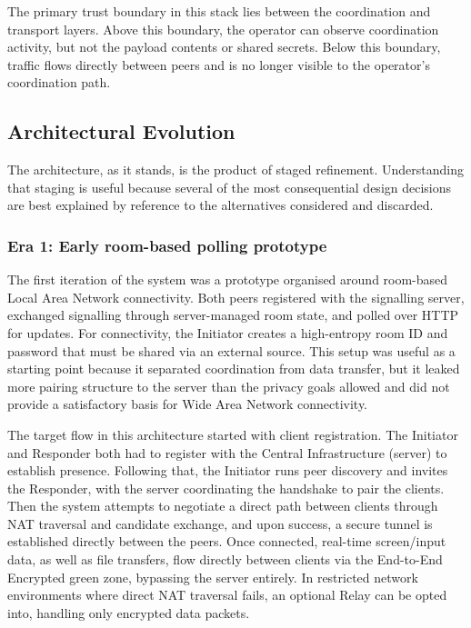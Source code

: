 \documentclass[12pt,a4paper]{article}
\begin{document}
The primary trust boundary in this stack lies between the coordination and transport layers. Above this boundary, the operator can observe coordination activity, but not the payload contents or shared secrets. Below this boundary, traffic flows directly between peers and is no longer visible to the operator’s coordination path.

\subsection{Architectural Evolution}

The architecture, as it stands, is the product of staged refinement. Understanding that staging is useful because several of the most consequential design decisions are best explained by reference to the alternatives considered and discarded.

\subsubsection{Era 1: Early room-based polling prototype}

The first iteration of the system was a prototype organised around room-based Local Area Network connectivity. Both peers registered with the signalling server, exchanged signalling through server-managed room state, and polled over HTTP for updates. For connectivity, the Initiator creates a high-entropy room ID and password that must be shared via an external source. This setup was useful as a starting point because it separated coordination from data transfer, but it leaked more pairing structure to the server than the privacy goals allowed and did not provide a satisfactory basis for Wide Area Network connectivity.

The target flow in this architecture started with client registration. The Initiator and Responder both had to register with the Central Infrastructure (server) to establish presence. Following that, the Initiator runs peer discovery and invites the Responder, with the server coordinating the handshake to pair the clients. Then the system attempts to negotiate a direct path between clients through NAT traversal and candidate exchange, and upon success, a secure tunnel is established directly between the peers. Once connected, real-time screen/input data, as well as file transfers, flow directly between clients via the End-to-End Encrypted green zone, bypassing the server entirely. In restricted network environments where direct NAT traversal fails, an optional Relay can be opted into, handling only encrypted data packets.
\end{document}
